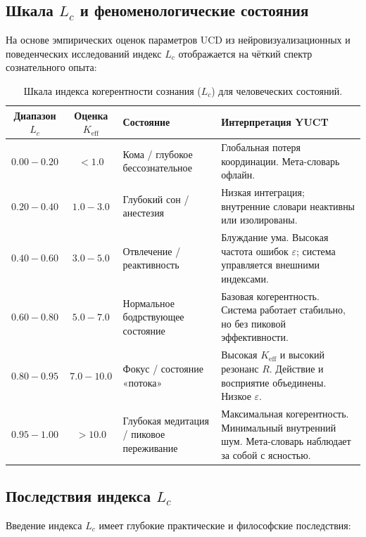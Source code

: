 \documentclass[12pt,a4paper]{article}
\begin{document}
	\subsection{Шкала \(L_c\) и феноменологические состояния}
	
	На основе эмпирических оценок параметров UCD из нейровизуализационных и поведенческих исследований индекс \(L_c\) отображается на чёткий спектр сознательного опыта:
	
	\begin{table}[H]
		\centering
		\caption{Шкала индекса когерентности сознания (\(L_c\)) для человеческих состояний.}
		\label{tab:Lc-scale}
		\begin{tabular}{c c l p{6cm}}
			\toprule
			\textbf{Диапазон \(L_c\)} & \textbf{Оценка \(K_{\mathrm{eff}}\)} & \textbf{Состояние} & \textbf{Интерпретация YUCT} \\
			\midrule
			\(0.00 - 0.20\) & \(< 1.0\) & Кома / глубокое бессознательное & Глобальная потеря координации. Мета-словарь офлайн. \\
			\(0.20 - 0.40\) & \(1.0 - 3.0\) & Глубокий сон / анестезия & Низкая интеграция; внутренние словари неактивны или изолированы. \\
			\(0.40 - 0.60\) & \(3.0 - 5.0\) & Отвлечение / реактивность & Блуждание ума. Высокая частота ошибок \(\varepsilon\); система управляется внешними индексами. \\
			\(0.60 - 0.80\) & \(5.0 - 7.0\) & Нормальное бодрствующее состояние & Базовая когерентность. Система работает стабильно, но без пиковой эффективности. \\
			\(0.80 - 0.95\) & \(7.0 - 10.0\) & Фокус / состояние «потока» & Высокая \(K_{\mathrm{eff}}\) и высокий резонанс \(R\). Действие и восприятие объединены. Низкое \(\varepsilon\). \\
			\(0.95 - 1.00\) & \(> 10.0\) & Глубокая медитация / пиковое переживание & Максимальная когерентность. Минимальный внутренний шум. Мета-словарь наблюдает за собой с ясностью. \\
			\bottomrule
		\end{tabular}
	\end{table}
	
	\subsection{Последствия индекса \(L_c\)}
	
	Введение индекса \(L_c\) имеет глубокие практические и философские последствия:
	
\end{document}
